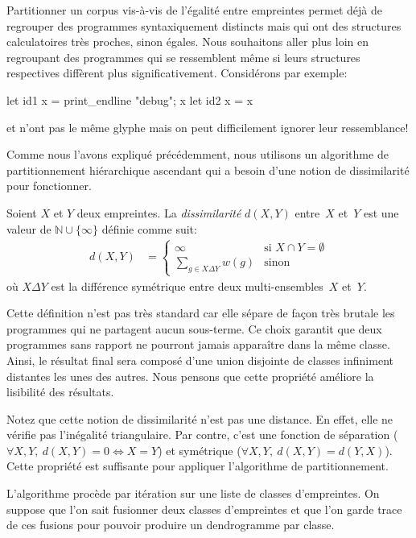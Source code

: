 
Partitionner un corpus vis-à-vis de l'égalité entre empreintes permet
déjà de regrouper des programmes syntaxiquement distincts mais qui ont
des structures calculatoires très proches, sinon égales. Nous
souhaitons aller plus loin en regroupant des programmes qui se
ressemblent même si leurs structures respectives diffèrent
plus significativement. Considérons par exemple:

\begin{ocaml}
let id1 x = print_endline "debug"; x
let id2 x = x
\end{ocaml}
\noindent {} et  n'ont pas le même glyphe mais
on peut difficilement ignorer leur ressemblance!

Comme nous l'avons expliqué précédemment, nous utilisons un algorithme
de partitionnement hiérarchique ascendant qui a besoin d'une notion
de dissimilarité pour fonctionner.

\begin{defn}
Soient $X$ et $Y$ deux empreintes. La \textit{dissimilarité} $d(X, Y)$ entre~$X$ et~$Y$
est une valeur de $\mathbb{N} \cup \{ \infty \}$ définie comme suit:
\begin{align*}
d (X,Y) &=
\begin{cases}
	\infty & \text{si $X \cap Y = \emptyset$} \\
	\sum\limits_{g \in X \Delta Y} w(g) & \text{sinon}
\end{cases}
\end{align*}
\noindent où $X \Delta Y$ est la différence symétrique entre deux multi-ensembles~$X$ et~$Y$.
\end{defn}

Cette définition n'est pas très standard car elle sépare de façon très
brutale les programmes qui ne partagent aucun sous-terme. Ce choix
garantit que deux programmes sans rapport ne pourront jamais
apparaître dans la même classe. Ainsi, le résultat final sera composé
d'une union disjointe de classes infiniment distantes les unes des
autres. Nous pensons que cette propriété améliore la lisibilité des
résultats.

Notez que cette notion de dissimilarité n'est pas une distance. En
effet, elle ne vérifie pas l'inégalité triangulaire. Par contre, c'est
une fonction de séparation ($\forall X,Y,\ d(X,Y) = 0 \iff X = Y$) et
symétrique ($\forall X,Y,\ d(X,Y) = d(Y,X)$). Cette propriété est
suffisante pour appliquer l'algorithme de partitionnement.

L'algorithme procède par itération sur une liste de classes
d'empreintes. On suppose que l'on sait fusionner deux classes
d'empreintes et que l'on garde trace de ces fusions pour pouvoir
produire un dendrogramme par classe.

